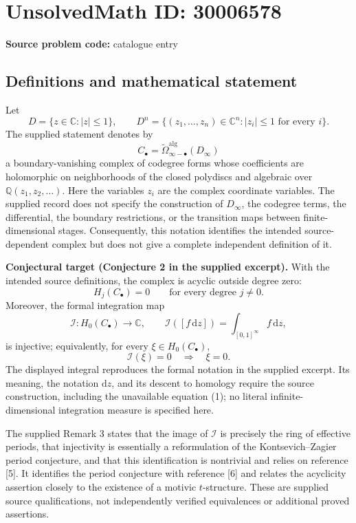 \documentclass[11pt]{article}
\newcommand{\Q}{\mathbb{Q}}
\newcommand{\C}{\mathbb{C}}
\begin{document}
\section*{UnsolvedMath ID: 30006578}
\textbf{Source problem code:} catalogue entry
\subsection{Definitions and mathematical statement}
Let
\[
D=\{z\in\C:|z|\leq 1\},\qquad D^n=\{(z_1,\ldots,z_n)\in\C^n:|z_i|\leq 1\text{ for every }i\}.
\]
The supplied statement denotes by
\[
C_\bullet=\widetilde{\Omega}_{\infty-\bullet}^{\mathrm{alg}}(D_\infty)
\]
a boundary-vanishing complex of codegree forms whose coefficients are holomorphic on neighborhoods of the closed polydiscs and algebraic over \(\Q(z_1,z_2,\ldots)\). Here the variables \(z_i\) are the complex coordinate variables. The supplied record does not specify the construction of \(D_\infty\), the codegree terms, the differential, the boundary restrictions, or the transition maps between finite-dimensional stages. Consequently, this notation identifies the intended source-dependent complex but does not give a complete independent definition of it.

\textbf{Conjectural target (Conjecture 2 in the supplied excerpt).} With the intended source definitions, the complex is acyclic outside degree zero:
\[
H_j(C_\bullet)=0\qquad\text{for every degree }j\ne 0.
\]
Moreover, the formal integration map
\[
\mathcal I:H_0(C_\bullet)\longrightarrow\C,
\qquad
\mathcal I([f\,\mathrm dz])=\int_{[0,1]^\infty}f\,\mathrm dz,
\]
is injective; equivalently, for every \(\xi\in H_0(C_\bullet)\),
\[
\mathcal I(\xi)=0\quad\Longrightarrow\quad\xi=0.
\]
The displayed integral reproduces the formal notation in the supplied excerpt. Its meaning, the notation \(\mathrm dz\), and its descent to homology require the source construction, including the unavailable equation (1); no literal infinite-dimensional integration measure is specified here.

The supplied Remark 3 states that the image of \(\mathcal I\) is precisely the ring of effective periods, that injectivity is essentially a reformulation of the Kontsevich--Zagier period conjecture, and that this identification is nontrivial and relies on reference [5]. It identifies the period conjecture with reference [6] and relates the acyclicity assertion closely to the existence of a motivic \(t\)-structure. These are supplied source qualifications, not independently verified equivalences or additional proved assertions.
\end{document}
